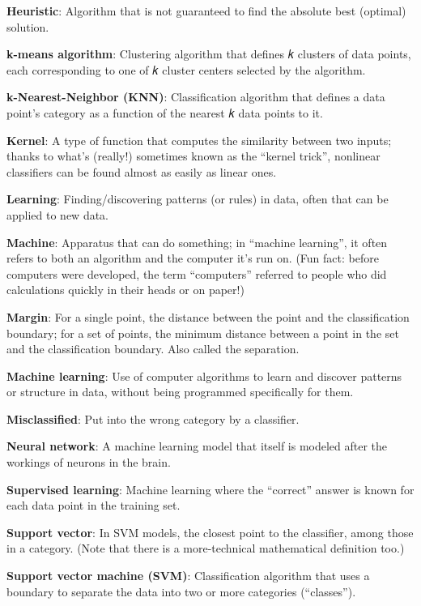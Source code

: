 \documentclass[
]{book}
\begin{document}
\textbf{Heuristic}: Algorithm that is not guaranteed to find the absolute best (optimal) solution.

\newpage

\textbf{k-means algorithm}: Clustering algorithm that defines 𝑘 clusters of data points, each corresponding to one of 𝑘 cluster centers selected by the algorithm.

\textbf{k-Nearest-Neighbor (KNN)}: Classification algorithm that defines a data point's category as a function of the nearest 𝑘 data points to it.

\textbf{Kernel}: A type of function that computes the similarity between two inputs; thanks to what's (really!) sometimes known as the ``kernel trick'', nonlinear classifiers can be found almost as easily as linear ones.

\textbf{Learning}: Finding/discovering patterns (or rules) in data, often that can be applied to new data.

\textbf{Machine}: Apparatus that can do something; in ``machine learning'', it often refers to both an algorithm and the computer it's run on. (Fun fact: before computers were developed, the term ``computers'' referred to people who did calculations quickly in their heads or on paper!)

\textbf{Margin}: For a single point, the distance between the point and the classification boundary; for a set of points, the minimum distance between a point in the set and the classification boundary. Also called the separation.

\textbf{Machine learning}: Use of computer algorithms to learn and discover patterns or structure in data, without being programmed specifically for them.

\textbf{Misclassified}: Put into the wrong category by a classifier.

\textbf{Neural network}: A machine learning model that itself is modeled after the workings of neurons in the brain.

\textbf{Supervised learning}: Machine learning where the ``correct'' answer is known for each data point in the training set.

\textbf{Support vector}: In SVM models, the closest point to the classifier, among those in a category. (Note that there is a more-technical mathematical definition too.)

\textbf{Support vector machine (SVM)}: Classification algorithm that uses a boundary to separate the data into two or more categories (``classes'').
\end{document}
